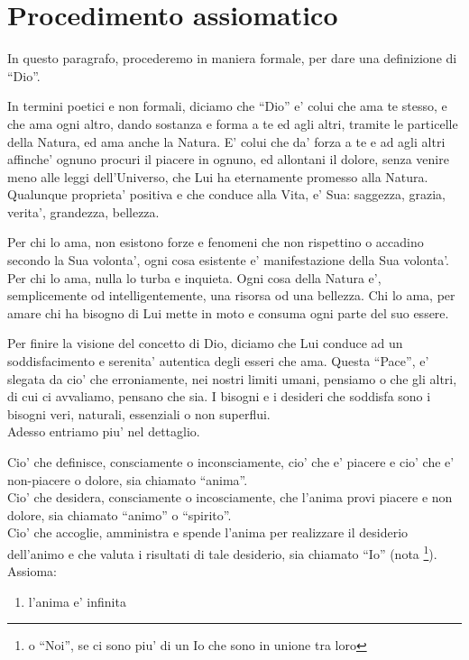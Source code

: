 \section{Procedimento assiomatico}
\label{procAx}

In questo paragrafo, procederemo in maniera formale, per dare una definizione di ``Dio''.

In termini poetici e non formali, diciamo che ``Dio'' e' colui che ama te stesso, e che ama ogni altro, dando sostanza e forma a te ed agli altri, tramite le particelle della Natura, ed ama anche la Natura. E' colui che da' forza a te e ad agli altri affinche' ognuno procuri il piacere in ognuno, ed allontani il dolore, senza venire meno alle leggi dell'Universo, che Lui ha eternamente promesso alla Natura. Qualunque proprieta' positiva e che conduce alla Vita, e' Sua: saggezza, grazia, verita', grandezza, bellezza.

Per chi lo ama, non esistono forze e fenomeni che non rispettino o accadino secondo la Sua volonta', ogni cosa esistente e' manifestazione della Sua volonta'. Per chi lo ama, nulla lo turba e inquieta. Ogni cosa della Natura e', semplicemente od intelligentemente, una risorsa od una bellezza. Chi lo ama, per amare chi ha bisogno di Lui mette in moto e consuma ogni parte del suo essere.

Per finire la visione del concetto di Dio, diciamo che Lui conduce ad un soddisfacimento e serenita' autentica degli esseri che ama. Questa ``Pace'', e' slegata da cio' che erroniamente, nei nostri limiti umani, pensiamo o che gli altri, di cui ci avvaliamo, pensano che sia. I bisogni e i desideri che soddisfa sono i bisogni veri, naturali, essenziali o non superflui.\\

Adesso entriamo piu' nel dettaglio.

Cio' che definisce, consciamente o inconsciamente, cio' che e' piacere e cio' che e' non-piacere o dolore, sia chiamato ``anima''.\\
Cio' che desidera, consciamente o incosciamente, che l'anima provi piacere e non dolore, sia chiamato ``animo'' o ``spirito''.\\
Cio' che accoglie, amministra e spende l'anima per realizzare il desiderio dell'animo e che valuta i risultati di tale desiderio, sia chiamato ``Io'' (nota \footnote{o ``Noi'', se ci sono piu' di un Io che sono in unione tra loro}).\\

Assioma:
\begin{enumerate}
    \item l'anima e' infinita
\end{enumerate}

